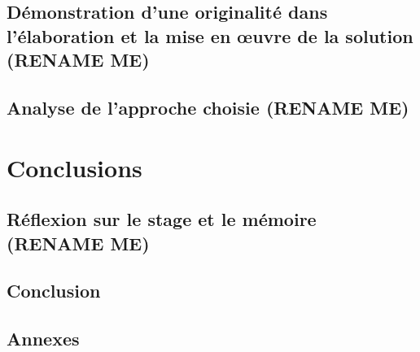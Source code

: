 \documentclass[12pt,a4paper,article]{memoir} %
\begin{document}
\paragraph{} \lipsum

\section{Démonstration d’une originalité dans l’élaboration et la mise en œuvre de la solution (RENAME ME) }

\paragraph{} \lipsum

\section{ Analyse de l’approche choisie (RENAME ME) }

\paragraph{} \lipsum

\newpage
\chapter{Conclusions}

\section{ Réflexion sur le stage et le mémoire (RENAME ME) }

\paragraph{} \lipsum

\section{ Conclusion }

\paragraph{} \lipsum

\section{ Annexes }

\paragraph{} \lipsum
\end{document}
